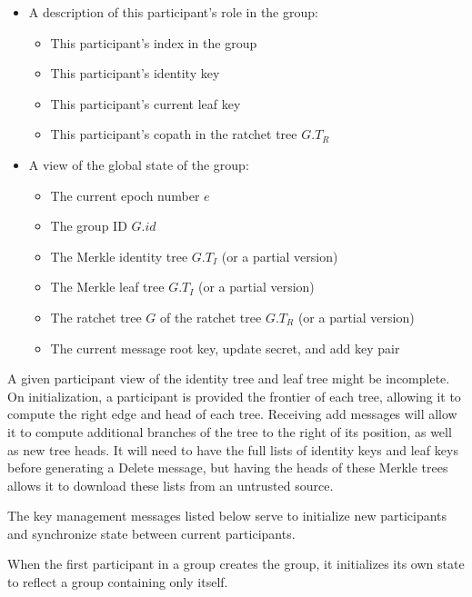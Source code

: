\documentclass[11pt, oneside]{article}
\begin{document}
\begin{itemize}
\item{A description of this participant's role in the group:
	\begin{itemize}
	\item{This participant's index in the group}
	\item{This participant's identity key}
	\item{This participant's current leaf key}
	\item{This participant's copath in the ratchet tree $G.T_R$}
	\end{itemize}
}
\item{A view of the global state of the group:
	\begin{itemize}
	\item{The current epoch number $e$}
	\item{The group ID $G.id$}
	\item{The Merkle identity tree $G.T_I$ (or a partial version)}
	\item{The Merkle leaf tree $G.T_I$ (or a partial version)}
	\item{The ratchet tree $G$ of the ratchet tree $G.T_R$ (or a partial version)}
	\item{The current message root key, update secret, and add key pair}
	\end{itemize}
}
\end{itemize}

A given participant view of the identity tree and leaf tree might be incomplete.  On initialization, a participant is provided the frontier of each tree, allowing it to compute the right edge and head of each tree.  Receiving add messages will allow it to compute additional branches of the tree to the right of its position, as well as new tree heads.  It will need to have the full lists of identity keys and leaf keys before generating a Delete message, but having the heads of these Merkle trees allows it to download these lists from an untrusted source.

The key management messages listed below serve to initialize new participants and synchronize state between current participants.

When the first participant in a group creates the group, it initializes its own state to reflect a group containing only itself.
\end{document}
